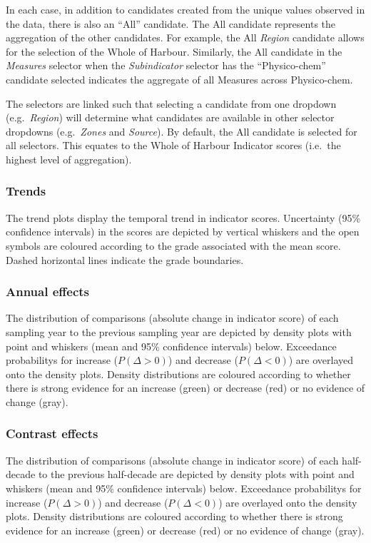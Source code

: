 \documentclass[
  8pt,
  a4paper]{article}
\begin{document}
In each case, in addition to candidates created from the unique values
observed in the data, there is also an ``All'' candidate. The All
candidate represents the aggregation of the other candidates. For
example, the All \emph{Region} candidate allows for the selection of the
Whole of Harbour. Similarly, the All candidate in the \emph{Measures}
selector when the \emph{Subindicator} selector has the ``Physico-chem''
candidate selected indicates the aggregate of all Measures across
Physico-chem.

The selectors are linked such that selecting a candidate from one
dropdown (e.g.~\emph{Region}) will determine what candidates are
available in other selector dropdowns (e.g.~\emph{Zones} and
\emph{Source}). By default, the All candidate is selected for all
selectors. This equates to the Whole of Harbour Indicator scores
(i.e.~the highest level of aggregation).

\subsubsection{Trends}\label{trends}

The trend plots display the temporal trend in indicator scores.
Uncertainty (95\% confidence intervals) in the scores are depicted by
vertical whiskers and the open symbols are coloured according to the
grade associated with the mean score. Dashed horizontal lines indicate
the grade boundaries.

\subsubsection{Annual effects}\label{annual-effects}

The distribution of comparisons (absolute change in indicator score) of
each sampling year to the previous sampling year are depicted by density
plots with point and whiskers (mean and 95\% confidence intervals)
below. Exceedance probabilitys for increase (\(P(\Delta>0)\)) and
decrease (\(P(\Delta<0)\)) are overlayed onto the density plots. Density
distributions are coloured according to whether there is strong evidence
for an increase (green) or decrease (red) or no evidence of change
(gray).

\subsubsection{Contrast effects}\label{contrast-effects}

The distribution of comparisons (absolute change in indicator score) of
each half-decade to the previous half-decade are depicted by density
plots with point and whiskers (mean and 95\% confidence intervals)
below. Exceedance probabilitys for increase (\(P(\Delta>0)\)) and
decrease (\(P(\Delta<0)\)) are overlayed onto the density plots. Density
distributions are coloured according to whether there is strong evidence
for an increase (green) or decrease (red) or no evidence of change
(gray).
\end{document}
